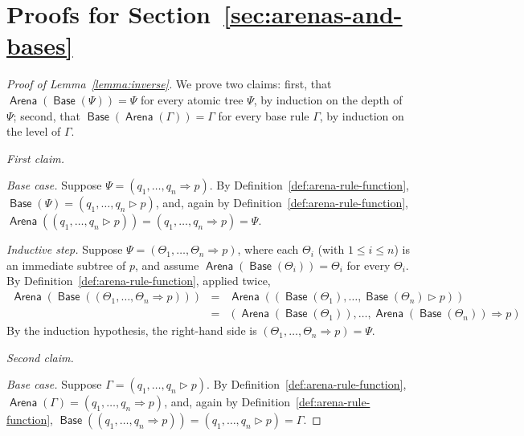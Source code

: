 \documentclass{lipics-v2021}
\newcommand{\brule}[1]{\triangleright{#1}}         %
\newcommand{\atree}[2]{#1 \Rightarrow #2}              %
\newcommand{\tobase}[1]{\mathrel{\textsf{Base}}(#1)}            %
\newcommand{\toarena}[1]{\mathrel{\textsf{Arena}}(#1)}           %
\begin{document}
\section{Proofs for Section~\ref{sec:arenas-and-bases}}
\label{app:sec-arenas-and-bases}

\begin{proof}[Proof of Lemma~\ref{lemma:inverse}]
We prove two claims: first, that $\toarena{\tobase{\Psi}} = \Psi$ for every
atomic tree $\Psi$, by induction on the depth of $\Psi$; second, that
$\tobase{\toarena{\Gamma}} = \Gamma$ for every base rule $\Gamma$, by
induction on the level of $\Gamma$.

\medskip

\noindent\emph{First claim.}

\smallskip

\noindent\emph{Base case.} Suppose $\Psi = (\atree{q_1, \ldots, q_n}{p})$. By
Definition~\ref{def:arena-rule-function},
$\tobase{\Psi} = (q_1, \ldots, q_n \brule p)$, and, again by
Definition~\ref{def:arena-rule-function},
$\toarena{(q_1, \ldots, q_n \brule p)} = (\atree{q_1, \ldots, q_n}{p}) = \Psi$.

\smallskip

\noindent\emph{Inductive step.} Suppose
$\Psi = (\atree{\Theta_1, \ldots, \Theta_n}{p})$, where each $\Theta_i$ (with
$1 \leq i \leq n$) is an immediate subtree of $p$, and assume
$\toarena{\tobase{\Theta_i}} = \Theta_i$ for every $\Theta_i$. By
Definition~\ref{def:arena-rule-function}, applied twice,
\[
\begin{array}{rcl}
\toarena{\tobase{(\atree{\Theta_1, \ldots, \Theta_n}{p})}}
    & = & \toarena{(\tobase{\Theta_1}, \ldots, \tobase{\Theta_n} \brule p)} \\
    & = & (\atree{\toarena{\tobase{\Theta_1}}, \ldots , 
          \toarena{\tobase{\Theta_n}}}{p})
\end{array}
\]
By the induction hypothesis, the right-hand side is
$(\atree{\Theta_1, \ldots, \Theta_n}{p}) = \Psi$.

\medskip

\noindent\emph{Second claim.}

\smallskip

\noindent\emph{Base case.} Suppose $\Gamma = (q_1, \ldots, q_n \brule p)$. By
Definition~\ref{def:arena-rule-function},
$\toarena{\Gamma} = (\atree{q_1, \ldots, q_n}{p})$, and, again by
Definition~\ref{def:arena-rule-function},
$\tobase{(\atree{q_1, \ldots, q_n}{p})} = (q_1, \ldots, q_n \brule p) = \Gamma$.


\end{proof}
\end{document}
